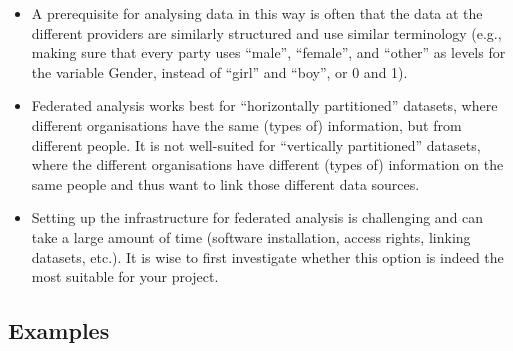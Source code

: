 \documentclass[
]{book}
\providecommand{\tightlist}{%
  \setlength{\itemsep}{0pt}\setlength{\parskip}{0pt}}
\begin{document}
\begin{itemize}
\tightlist
\item
  A prerequisite for analysing data in this way is often that the data at the
  different providers are similarly structured and use similar terminology (e.g.,
  making sure that every party uses ``male'', ``female'', and ``other'' as levels for
  the variable Gender, instead of ``girl'' and ``boy'', or 0 and 1).
\item
  Federated analysis works best for ``horizontally partitioned'' datasets, where
  different organisations have the same (types of) information, but from different
  people. It is not well-suited for ``vertically partitioned'' datasets, where the
  different organisations have different (types of) information on the same people
  and thus want to link those different data sources.
\item
  Setting up the infrastructure for federated analysis is challenging and can
  take a large amount of time (software installation, access rights, linking
  datasets, etc.). It is wise to first investigate whether this option is indeed
  the most suitable for your project.
\end{itemize}

\hypertarget{examples-2}{%
\subsection{Examples}\label{examples-2}}
\end{document}
